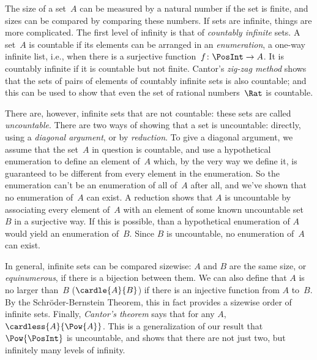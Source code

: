 The size of a set~$A$ can be measured by a natural number if the set
is finite, and sizes can be compared by comparing these numbers. If sets
are infinite, things are more complicated. The first level of
infinity is that of \emph{countably infinite} sets. A set~$A$ is
countable if its elements can be arranged in an \emph{enumeration}, a
one-way infinite list, i.e., when there is a
surjective function~$f\colon \PosInt \to A$. It is countably infinite
if it is countable but not finite. Cantor's \emph{zig-zag method}
shows that the sets of pairs of elements of countably infinite sets is
also countable; and this can be used to show that even the set of
rational numbers~$\Rat$ is countable.

There are, however, infinite sets that are not countable: these sets
are called \emph{uncountable}. There are two ways of showing that a
set is uncountable: directly, using a \emph{diagonal argument}, or by
\emph{reduction}. To give a diagonal argument, we assume that the
set~$A$ in question is countable, and use a hypothetical enumeration
to define an element of~$A$ which, by the very way we define it, is
guaranteed to be different from every element in the enumeration. So
the enumeration can't be an enumeration of all of~$A$ after all, and
we've shown that no enumeration of~$A$ can exist. A reduction shows
that $A$ is uncountable by associating every element of~$A$ with an
element of some known uncountable set~$B$ in a surjective way. If
this is possible, than a hypothetical enumeration of $A$ would yield
an enumeration of~$B$. Since $B$ is uncountable, no enumeration of~$A$
can exist.

In general, infinite sets can be compared sizewise: $A$ and $B$ are
the same size, or \emph{equinumerous}, if there is a bijection between
them. We can also define that $A$ is no larger than~$B$
($\cardle{A}{B}$) if there is an injective function from $A$ to~$B$.
By the Schr\"oder-Bernstein Theorem, this in fact provides a sizewise
order of infinite sets. Finally, \emph{Cantor's theorem} says that for
any $A$, $\cardless{A}{\Pow{A}}$. This is a generalization of our
result that $\Pow{\PosInt}$ is uncountable, and shows that there are
not just two, but infinitely many levels of infinity.
